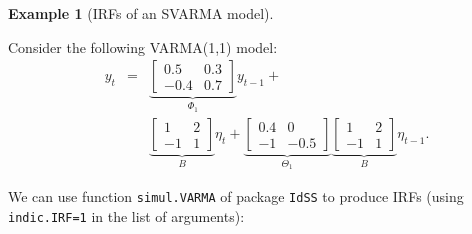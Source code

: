 \documentclass[
  12pt,
]{book}
\theoremstyle{definition}
\theoremstyle{definition}
\newtheorem{example}{Example}[chapter]
\theoremstyle{definition}
\theoremstyle{definition}
\theoremstyle{remark}
\begin{document}
\begin{example}[IRFs of an SVARMA model]
\protect\hypertarget{exm:IRFVARMA}{}\label{exm:IRFVARMA}

Consider the following VARMA(1,1) model:
\begin{eqnarray}
\quad y_t &=&
\underbrace{\left[\begin{array}{cc}
0.5 & 0.3 \\
-0.4 & 0.7
\end{array}\right]}_{\Phi_1}
y_{t-1} +  \\
&& \underbrace{\left[\begin{array}{cc}
1 & 2 \\
-1 & 1
\end{array}\right]}_{B}\eta_t + \underbrace{\left[\begin{array}{cc}
0.4 & 0 \\
-1 & -0.5
\end{array}\right]}_{\Theta_1} \underbrace{\left[\begin{array}{cc}
1 & 2 \\
-1 & 1
\end{array}\right]}_{B}\eta_{t-1}.
\label{eq:VARMA111}
\end{eqnarray}

We can use function \texttt{simul.VARMA} of package \texttt{IdSS} to produce IRFs (using \texttt{indic.IRF=1} in the list of arguments):


\end{example}
\end{document}
